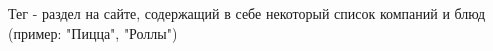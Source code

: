 Тег - раздел на сайте, содержащий в себе некоторый список компаний и блюд
(пример: "Пицца", "Роллы")
